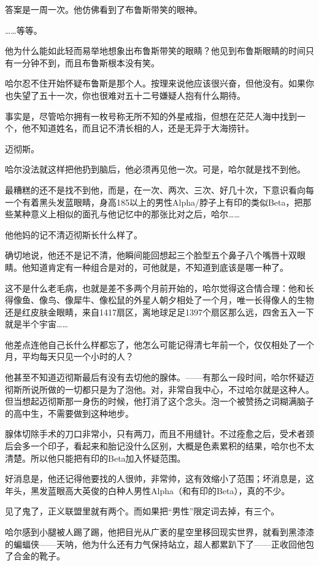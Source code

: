 \documentclass[../main]{subfiles}
\begin{document}
答案是一周一次。他仿佛看到了布鲁斯带笑的眼神。

……等等。

他为什么能如此轻而易举地想象出布鲁斯带笑的眼睛？他见到布鲁斯眼睛的时间只有一分钟不到，而且布鲁斯根本没有笑。

哈尔忍不住开始怀疑布鲁斯是那个人。按理来说他应该很兴奋，但他没有。如果你也失望了五十一次，你也很难对五十二号嫌疑人抱有什么期待。

事实是，尽管哈尔拥有一枚号称无所不知的外星戒指，但想在茫茫人海中找到一个，他不知道姓名，而且记不清长相的人，还是无异于大海捞针。

迈彻斯。

哈尔没法就这样把他扔到脑后，他必须再见他一次。可是，哈尔就是找不到他。

最糟糕的还不是找不到他，而是，在一次、两次、三次、好几十次，下意识看向每一个有着黑头发蓝眼睛，身高185以上的男性Alpha/脖子上有印的类似Beta，把那些某种意义上相似的面孔与他记忆中的那张比对之后，哈尔……

他他妈的记不清迈彻斯长什么样了。

确切地说，他还不是记不清，他瞬间能回想起三个脸型五个鼻子八个嘴唇十双眼睛。他知道肯定有一种组合是对的，可他就是，不知道到底该是哪一种了。

这不是什么老毛病，也就是差不多两个月前开始的，哈尔觉得这合情合理：他和长得像鱼、像鸟、像犀牛、像松鼠的外星人朝夕相处了一个月，唯一长得像人的生物还是红皮肤金眼睛，来自1417扇区，离地球足足1397个扇区那么远，四舍五入一下就是半个宇宙……

他差点连他自己长什么样都忘了，他怎么可能记得清七年前一个，仅仅相处了一个月，平均每天只见一个小时的人？

他甚至不知道迈彻斯最后有没有去切他的腺体。——有那么一段时间，哈尔怀疑迈彻斯所说所做的一切都只是为了泡他。对，非常自我中心，不过哈尔就是这种人。但当想起迈彻斯那一身伤的时候，他打消了这个念头。泡一个被赞扬之词糊满脑子的高中生，不需要做到这种地步。

腺体切除手术的刀口非常小，只有两刀，而且不用缝针。不过痊愈之后，受术者颈后会多一个印子，看起来和胎记没什么区别，大概是色素累积的结果，哈尔也不太清楚。所以他只能把有印的Beta加入怀疑范围。

好消息是，他还记得他要找的人很帅，非常帅，这有效缩小了范围；坏消息是，这年头，黑发蓝眼高大英俊的白种人男性Alpha（和有印的Beta），真的不少。

见了鬼了，正义联盟里就有两个。而如果把“男性”限定词去掉，有三个。

哈尔感到小腿被人踢了踢，他把目光从广袤的星空里移回现实世界，就看到黑漆漆的蝙蝠侠——天呐，他为什么还有力气保持站立，超人都累趴下了——正收回他包了合金的靴子。
\end{document}
